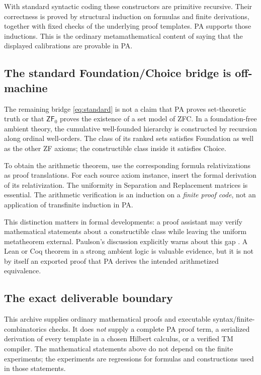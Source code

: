 \documentclass[11pt,letterpaper]{article}
\theoremstyle{definition}\newtheorem{definition}[theorem]{Definition}
\theoremstyle{remark}\newtheorem{remark}[theorem]{Remark}
\newcommand{\ZFz}{\mathsf{ZF}_{0}}
\begin{document}
With standard syntactic coding these constructors are primitive
recursive. Their correctness is proved by structural induction on
formulas and finite derivations, together with fixed checks of the
underlying proof templates. PA supports those inductions. This is the
ordinary metamathematical content of saying that the displayed
calibrations are provable in PA.

\subsection{The standard Foundation/Choice bridge is off-machine}

The remaining bridge \eqref{eq:standard} is not a claim that PA proves
set-theoretic truth or that $\ZFz$ proves the existence of a set model of
ZFC. In a foundation-free ambient theory, the cumulative well-founded
hierarchy is constructed by recursion along ordinal well-orders. The
class of its ranked sets satisfies Foundation as well as the other ZF
axioms; the constructible class inside it satisfies Choice.

To obtain the arithmetic theorem, use the corresponding formula
relativizations as proof translations. For each source axiom instance,
insert the formal derivation of its relativization. The uniformity in
Separation and Replacement matrices is essential. The arithmetic
verification is an induction on a \emph{finite proof code}, not an
application of transfinite induction in PA.

This distinction matters in formal developments: a proof assistant may
verify mathematical statements about a constructible class while leaving
the uniform metatheorem external. Paulson's discussion explicitly warns
about this gap \cite{paulson}. A Lean or Coq theorem in a strong ambient
logic is valuable evidence, but it is not by itself an exported proof
that PA derives the intended arithmetized equivalence.

\subsection{The exact deliverable boundary}

This archive supplies ordinary mathematical proofs and executable
syntax/finite-combinatorics checks. It does \emph{not} supply a complete
PA proof term, a serialized derivation of every template in a chosen
Hilbert calculus, or a verified TM compiler. The mathematical statements
above do not depend on the finite experiments; the experiments are
regressions for formulas and constructions used in those statements.
\end{document}
